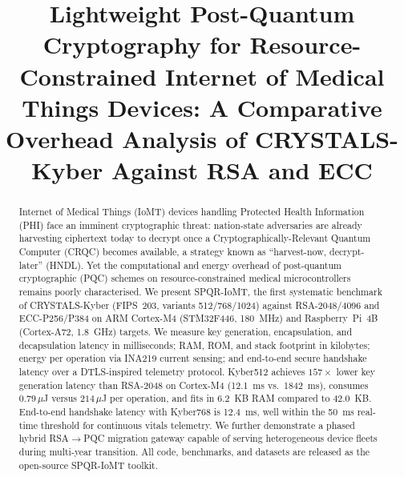 \documentclass[10pt,journal,compsoc]{IEEEtran}
\begin{document}
\title{Lightweight Post-Quantum Cryptography for Resource-Constrained
       Internet of Medical Things Devices: A Comparative Overhead
       Analysis of CRYSTALS-Kyber Against RSA and ECC}

\author{
}


\maketitle

\begin{abstract}
Internet of Medical Things (IoMT) devices handling Protected Health
Information (PHI) face an imminent cryptographic threat: nation-state
adversaries are already harvesting ciphertext today to decrypt once a
Cryptographically-Relevant Quantum Computer (CRQC) becomes available,
a strategy known as ``harvest-now, decrypt-later'' (HNDL).
Yet the computational and energy overhead of post-quantum cryptographic
(PQC) schemes on resource-constrained medical microcontrollers remains
poorly characterised.
We present SPQR-IoMT, the first systematic benchmark of
CRYSTALS-Kyber (FIPS~203, variants 512/768/1024) against RSA-2048/4096
and ECC-P256/P384 on ARM Cortex-M4 (STM32F446, 180~MHz) and
Raspberry~Pi~4B (Cortex-A72, 1.8~GHz) targets.
We measure key generation, encapsulation, and decapsulation latency
in milliseconds; RAM, ROM, and stack footprint in kilobytes;
energy per operation via INA219 current sensing; and end-to-end
secure handshake latency over a DTLS-inspired telemetry protocol.
Kyber512 achieves $157\times$ lower key generation latency than
RSA-2048 on Cortex-M4 (12.1~ms vs.\ 1842~ms), consumes
$0.79\,\mu$J versus $214\,\mu$J per operation, and fits in 6.2~KB RAM
compared to 42.0~KB.
End-to-end handshake latency with Kyber768 is 12.4~ms, well within
the 50~ms real-time threshold for continuous vitals telemetry.
We further demonstrate a phased hybrid RSA$\to$PQC migration gateway
capable of serving heterogeneous device fleets during multi-year
transition.
All code, benchmarks, and datasets are released as the open-source
SPQR-IoMT toolkit.
\end{abstract}
\end{document}
